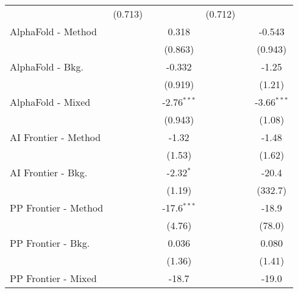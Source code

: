 \begin{tabular}{lcccccc}
                                & (0.713)       &              &               & (0.712)       &              &   \\   
   AlphaFold - Method           &               &              & 0.318         &               &              & -0.543\\   
                                &               &              & (0.863)       &               &              & (0.943)\\   
   AlphaFold - Bkg.             &               &              & -0.332        &               &              & -1.25\\   
                                &               &              & (0.919)       &               &              & (1.21)\\   
   AlphaFold - Mixed            &               &              & -2.76$^{***}$ &               &              & -3.66$^{***}$\\   
                                &               &              & (0.943)       &               &              & (1.08)\\   
   AI Frontier - Method         &               &              & -1.32         &               &              & -1.48\\   
                                &               &              & (1.53)        &               &              & (1.62)\\   
   AI Frontier - Bkg.           &               &              & -2.32$^{*}$   &               &              & -20.4\\   
                                &               &              & (1.19)        &               &              & (332.7)\\   
   PP Frontier - Method         &               &              & -17.6$^{***}$ &               &              & -18.9\\   
                                &               &              & (4.76)        &               &              & (78.0)\\   
   PP Frontier - Bkg.           &               &              & 0.036         &               &              & 0.080\\   
                                &               &              & (1.36)        &               &              & (1.41)\\   
   PP Frontier - Mixed          &               &              & -18.7         &               &              & -19.0\\   

\end{tabular}
